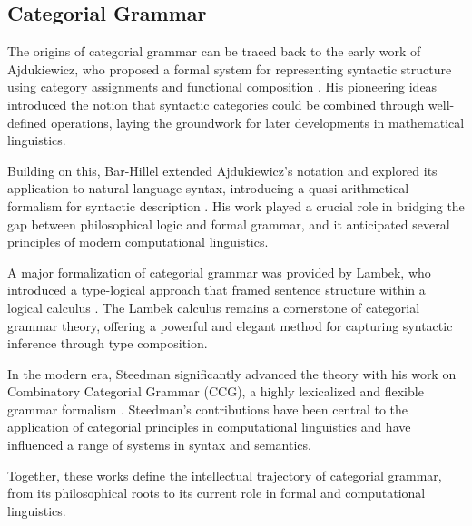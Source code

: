 \subsection{Categorial Grammar}

The origins of categorial grammar can be traced back to the early work of Ajdukiewicz, who proposed a formal system for representing syntactic structure using category assignments and functional composition \cite{ajdukiewicz1935syntaktische}. His pioneering ideas introduced the notion that syntactic categories could be combined through well-defined operations, laying the groundwork for later developments in mathematical linguistics.

Building on this, Bar-Hillel extended Ajdukiewicz's notation and explored its application to natural language syntax, introducing a quasi-arithmetical formalism for syntactic description \cite{barhillel1953quasi}. His work played a crucial role in bridging the gap between philosophical logic and formal grammar, and it anticipated several principles of modern computational linguistics.

A major formalization of categorial grammar was provided by Lambek, who introduced a type-logical approach that framed sentence structure within a logical calculus \cite{lambek1958mathematics}. The Lambek calculus remains a cornerstone of categorial grammar theory, offering a powerful and elegant method for capturing syntactic inference through type composition.

In the modern era, Steedman significantly advanced the theory with his work on Combinatory Categorial Grammar (CCG), a highly lexicalized and flexible grammar formalism \cite{steedman1996surface}. Steedman's contributions have been central to the application of categorial principles in computational linguistics and have influenced a range of systems in syntax and semantics.

Together, these works define the intellectual trajectory of categorial grammar, from its philosophical roots to its current role in formal and computational linguistics.
